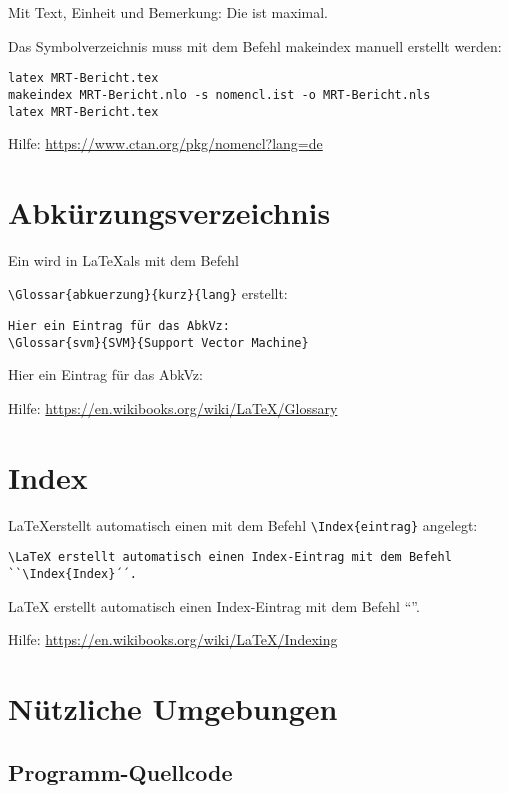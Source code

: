 Mit Text, Einheit und Bemerkung: Die 
 ist maximal.


Das Symbolverzeichnis muss mit dem Befehl \textsf{makeindex} manuell
erstellt werden:
%
\begin{verbatim}
latex MRT-Bericht.tex
makeindex MRT-Bericht.nlo -s nomencl.ist -o MRT-Bericht.nls
latex MRT-Bericht.tex
\end{verbatim}

Hilfe: \url{https://www.ctan.org/pkg/nomencl?lang=de}

\section{Abkürzungsverzeichnis}

Ein  wird in \LaTeX als 
mit dem Befehl

\verb#\Glossar{abkuerzung}{kurz}{lang}# erstellt:
%
\begin{verbatim}
Hier ein Eintrag für das AbkVz: 
\Glossar{svm}{SVM}{Support Vector Machine}
\end{verbatim}

Hier ein Eintrag für das AbkVz:

Hilfe: \url{https://en.wikibooks.org/wiki/LaTeX/Glossary}

\section{Index}

\LaTeX erstellt automatisch einen  mit dem Befehl
\verb#\Index{eintrag}# angelegt:

\begin{verbatim}
\LaTeX erstellt automatisch einen Index-Eintrag mit dem Befehl
``\Index{Index}´´.
\end{verbatim}

\LaTeX{} erstellt automatisch einen Index-Eintrag mit dem Befehl
``''.


Hilfe: \url{https://en.wikibooks.org/wiki/LaTeX/Indexing}


\section{Nützliche Umgebungen}

\subsection{Programm-Quellcode}

